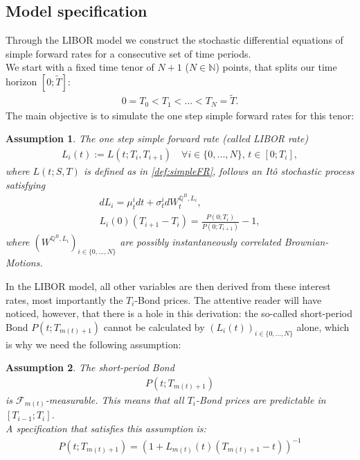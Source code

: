 \documentclass[12pt]{article}
\newtheorem{assumption}{Assumption}[section]
\begin{document}
	\subsection{Model specification}\label{sec:libModel}
	Through the LIBOR model we construct the stochastic differential equations of simple forward rates for a consecutive set of time periods.\\
	We start with a fixed time tenor of $N+1$ ($N \in \mathbb{N}$) points, that splits our time horizon $[0;\tilde{T}]$:
	\begin{align*}
		0 = T_0 < T_1 < ... < T_N = \tilde{T}.
	\end{align*}
	The main objective is to simulate the one step simple forward rates for this tenor:
	\begin{assumption}\label{as:LIBORisItoProcess}
		The one step simple forward rate (called LIBOR rate)
		\begin{align*}
			L_i(t) := L(t;T_i, T_{i+1}) \quad \forall i \in \{0, ..., N\}\text{, } t\in[0;T_i],
		\end{align*}
		where $L(t;S, T)$ is defined as in \cref{def:simpleFR},
		follows an Itô stochastic process satisfying
		\begin{align*}
			dL_i = \mu^i_t dt + \sigma^i_t dW^{\mathbb{Q}^B, L_i}_t,\\
			L_i(0)(T_{i+1} - T_i) = \frac{P(0;T_i)}{P(0;T_{i+1})} - 1,
		\end{align*}
		where $(W^{\mathbb{Q}^B, L_i})_{i\in \{0, ..., N\}}$ are possibly instantaneously correlated Brownian-Motions.
	\end{assumption}
	In the LIBOR model, all other variables are then derived from these interest rates, most importantly the $T_i$-Bond prices. The attentive reader will have noticed, however, that there is a hole in this derivation: the so-called short-period Bond $P(t;T_{m(t)+1})$ cannot be calculated by $(L_i(t))_{i\in\{0, ..., N\}}$ alone, which is why we need the following assumption:
	\begin{assumption}\label{as:LMMShortPeriodBond}
		The short-period Bond
		\begin{align*}
			P(t;T_{m(t)+1})
		\end{align*}
		is $\mathcal{F}_{m(t)}$-measurable. This means that all $T_i$-Bond prices are predictable in $[T_{i-1};T_i]$.\\
		A specification that satisfies this assumption is:
		\begin{align*}
			P(t;T_{m(t)+1}) = (1 + L_{m(t)}(t)(T_{m(t)+1} - t))^{-1}
		\end{align*}
	\end{assumption}
\end{document}
